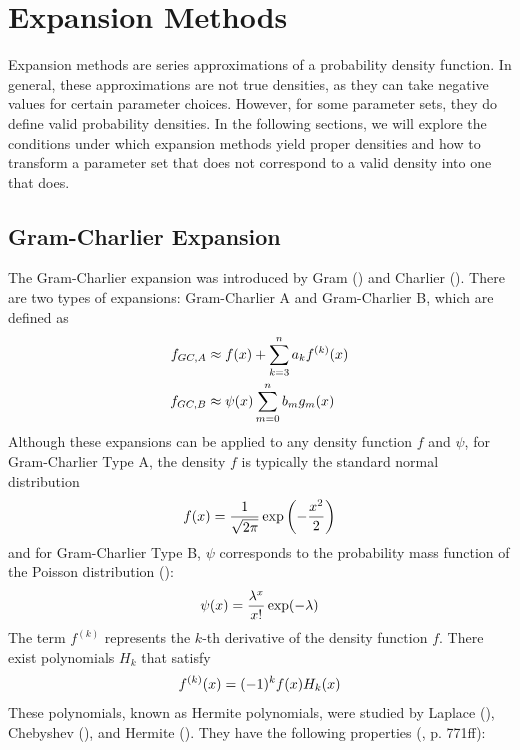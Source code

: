 \section{Expansion Methods}
\label{sec:expansion_methods}

Expansion methods are series approximations of a probability density function. In general, these approximations are not true densities, as they can take negative values for certain parameter choices. However, for some parameter sets, they do define valid probability densities. In the following sections, we will explore the conditions under which expansion methods yield proper densities and how to transform a parameter set that does not correspond to a valid density into one that does.

\subsection{Gram-Charlier Expansion}
The Gram-Charlier expansion was introduced by Gram (\citeyear{gramUeberEntwickelungReeller1883}) and Charlier (\citeyear{charlierContributionsMathematicalTheory1914}). There are two types of expansions: Gram-Charlier A and Gram-Charlier B, which are defined as
\begin{align}
    f_{GC,A} &\approx f(x) + \sum_{k=3}^n a_k f^{(k)}(x) \notag \\
    f_{GC,B} &\approx \psi(x)\sum_{m=0}^n b_mg_m(x) \notag
\end{align}
Although these expansions can be applied to any density function $f$ and $\psi$, for Gram-Charlier Type A, the density $f$ is typically the standard normal distribution
\begin{align}
    f(x) = \frac{1}{\sqrt{2\pi}}\exp\left(-\frac{x^2}{2}\right) \notag
\end{align}
and for Gram-Charlier Type B, $\psi$ corresponds to the probability mass function of the Poisson distribution (\cite{mitropolskiiGramCharlierSeries2020}):
\begin{align}
    \psi(x) = \frac{\lambda^x}{x!}\exp(-\lambda) \notag
\end{align}
The term $f^{(k)}$ represents the $k$-th derivative of the density function $f$. There exist polynomials $H_k$ that satisfy
\begin{align}
    f^{(k)}(x) = (-1)^k f(x)H_k(x) \notag
\end{align}
These polynomials, known as Hermite polynomials, were studied by Laplace (\citeyear{laplaceMemoireIntegralesDefinies1811,laplaceTheorieAnalytiqueProbabilites1812}), Chebyshev (\citeyear{chebyshevDeveloppementFonctionsSeule1860}), and Hermite (\citeyear{hermiteNouveauDeveloppementSerie1864}). They have the following properties (\cite{abramowitzHandbookMathematicalFunctions1968}, p. 771ff):
